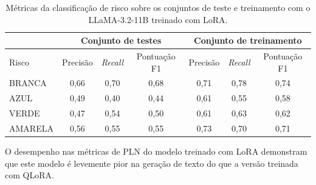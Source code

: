 \begin{table}[ht]
    \caption{\small Métricas da classificação de risco sobre os conjuntos de teste e treinamento com o
    \ac{LLaMA}-3.2-11B treinado com \ac{LoRA}.}
    \centering
    \begin{tabular}{l|c|c|c|c|c|c}
        \hline
                        & \multicolumn{3}{c|}{Conjunto de testes} & \multicolumn{3}{c}{Conjunto de treinamento}
        \\ \hline
        Risco           & Precisão                                & \textit{Recall}
                        & Pontuação F1                            & Precisão
                        &
        \textit{Recall} & Pontuação F1
        \\ \hline
        BRANCA          & 0,66                                    & 0,70                                        & 0,68
                        & 0,71                                    & 0,78                                        & 0,74
        \\
        AZUL            & 0,49                                    & 0,40                                        & 0,44
                        & 0,61                                    & 0,55                                        & 0,58
        \\
        VERDE           & 0,47                                    & 0,54                                        & 0,50
                        & 0,61                                    & 0,63                                        & 0,62
        \\
        AMARELA         & 0,56                                    & 0,55                                        & 0,55
                        & 0,73                                    & 0,70                                        & 0,71
        \\ \hline
    \end{tabular}
    \label{tab:lladerm_lora_risk_classification_report}
\end{table}

O desempenho nas métricas de \ac{PLN} do modelo treinado com \ac{LoRA} demonstram que este modelo é levemente pior na
geração de texto do que a versão treinada com \ac{QLoRA}.

